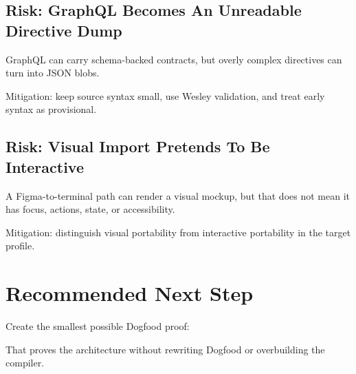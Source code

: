 \subsection{Risk: GraphQL Becomes An Unreadable Directive Dump}\label{record-139-risk-graphql-becomes-an-unreadable-directive-dump}

GraphQL can carry schema-backed contracts, but overly complex directives can turn into JSON blobs.

Mitigation: keep source syntax small, use Wesley validation, and treat early syntax as provisional.

\subsection{Risk: Visual Import Pretends To Be Interactive}\label{record-139-risk-visual-import-pretends-to-be-interactive}

A Figma-to-terminal path can render a visual mockup, but that does not mean it has focus, actions, state, or accessibility.

Mitigation: distinguish visual portability from interactive portability in the target profile.

\section{Recommended Next Step}\label{record-139-recommended-next-step}

Create the smallest possible Dogfood proof:



That proves the architecture without rewriting Dogfood or overbuilding the compiler.

